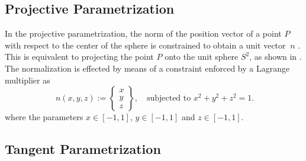 \documentclass[12pt]{article}
\numberwithin{equation}{section}
\begin{document}
\subsection{Projective Parametrization}
\label{subsec:projective}

In the projective parametrization, the norm of the position vector of
a point $P$ with respect to the center of the sphere is constrained to
obtain a unit vector $~n$ \citep{Ortiz.etal:1987}. This is
equivalent to projecting the point $P$ onto the unit sphere $S^2$, as
shown in . The normalization is effected
by means of a constraint enforced by a Lagrange multiplier as
\begin{equation}
  ~n(x,y,z)
  :=
  \begin{Bmatrix}
    x
    \\
    y
    \\
    z
  \end{Bmatrix},
  \quad
  \text{subjected to } x^2+y^2+z^2 = 1.
\end{equation}
where the parameters $x \in [-1, 1]$, $y \in [-1, 1]$
and $z \in [-1, 1]$.

\subsection{Tangent Parametrization}
\label{subsec:tangent}
\end{document}
